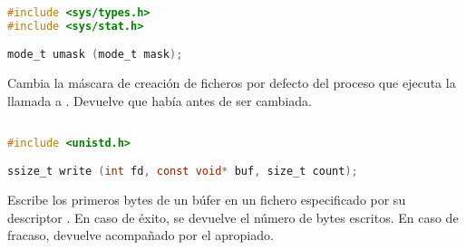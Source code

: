 \begin{lstlisting}[language=C]
#include <sys/types.h>
#include <sys/stat.h>

mode_t umask (mode_t mask);
\end{lstlisting}

Cambia la máscara de creación de ficheros por defecto del proceso que ejecuta la llamada a .
Devuelve que había antes de ser cambiada.

\subsection{}\label{write}

\begin{lstlisting}[language=C]
#include <unistd.h>

ssize_t write (int fd, const void* buf, size_t count);
\end{lstlisting}

Escribe los  primeros bytes de un búfer  en un fichero especificado por su descriptor .
En caso de éxito, se devuelve el número de bytes escritos.
En caso de fracaso, devuelve  acompañado por el  apropiado.
